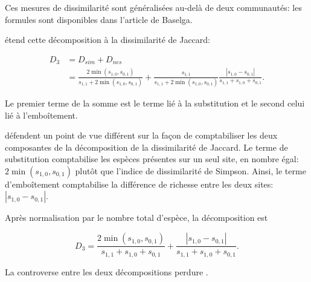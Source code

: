 \documentclass[
  11pt,
  french,
  a4paper,
  extrafontsizes,onecolumn,openright
  ]{memoir}
\begin{document}
Ces mesures de dissimilarité sont généralisées au-delà de deux communautés: les formules sont disponibles dans l'article de Baselga.

\textcite{Baselga2012} étend cette décomposition à la dissimilarité de Jaccard:

\begin{align}
  \label{eq:DNesReplBJ}
  D_3
  &= D_{sim} + D_{nes} \\
  &= \frac{2\min(s_{1,0},s_{0,1})}{s_{1,1}+2\min(s_{1,0},s_{0,1})}
  + \frac{s_{1,1}}{s_{1,1}+2\min(s_{1,0},s_{0,1})}\frac{|s_{1,0}-s_{0,1}|}{s_{1,1}+s_{1,0}+s_{0,1}}.
\end{align}

Le premier terme de la somme est le terme lié à la substitution et le second celui lié à l'emboîtement.

\textcite{Podani2011} défendent un point de vue différent sur la façon de comptabiliser les deux composantes de la décomposition de la dissimilarité de Jaccard.
Le terme de substitution comptabilise les espèces présentes sur un seul site, en nombre égal: \(2\min(s_{1,0},s_{0,1})\) plutôt que l'indice de dissimilarité de Simpson.
Ainsi, le terme d'emboîtement comptabilise la différence de richesse entre les deux sites: \(|s_{1,0}-s_{0,1}|\).

Après normalisation par le nombre total d'espèce, la décomposition est

\begin{equation}
  \label{eq:DNesReplPJ}
  D_3
  = \frac{2\min(s_{1,0},s_{0,1})}{s_{1,1} + s_{1,0} + s_{0,1}}
  + \frac{|s_{1,0}-s_{0,1}|}{s_{1,1} + s_{1,0} + s_{0,1}}.
\end{equation}

La controverse entre les deux décompositions perdure \autocite{Podani2016}.



\scriptsize
\end{document}

